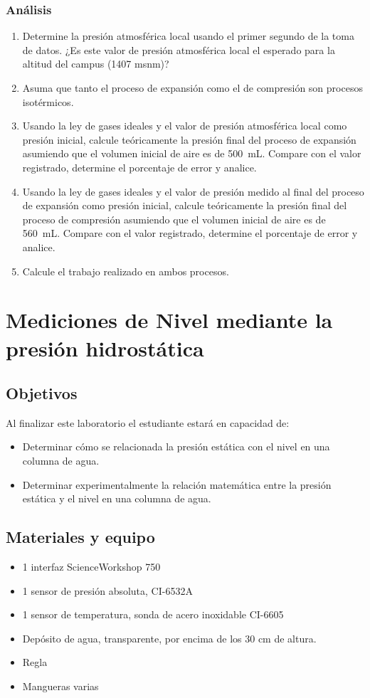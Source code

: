 \documentclass[12pt,letterpaper]{report}
\newcommand{\obj}{Objetivos}
\newcommand{\mat}{Materiales y equipo}
\newcommand{\capacidad}{Al finalizar este laboratorio el estudiante estará en capacidad de:}
\begin{document}
\subsection{Análisis}
\begin{enumerate}
    \item Determine la presión atmosférica local usando el primer segundo de la toma de datos. ¿Es este valor de presión atmosférica local el esperado para la altitud del campus (1407 msnm)?
    \item Asuma que tanto el proceso de expansión como el de compresión son procesos isotérmicos. 
    \item Usando la ley de gases ideales y el valor de presión atmosférica local como presión inicial, calcule teóricamente la presión final del proceso de expansión asumiendo que el volumen inicial de aire es de \SI{500}{\milli\liter}. Compare con el valor registrado, determine el porcentaje de error y analice.
    \item Usando la ley de gases ideales y el valor de presión medido al final del proceso de expansión como presión inicial, calcule teóricamente la presión final del proceso de compresión asumiendo que el volumen inicial de aire es de \SI{560}{\milli\liter}. Compare con el valor registrado, determine el porcentaje de error y analice.
    \item Calcule el trabajo realizado en ambos procesos.
\end{enumerate}




\chapter{Mediciones de Nivel mediante la presión hidrostática}
\section{\obj}
\capacidad
\begin{itemize}
\item Determinar cómo se relacionada la presión estática con el nivel en una
columna de agua.
\item Determinar experimentalmente la relación matemática entre la presión
estática y el nivel en una columna de agua.
\end{itemize}

\section{\mat}
\begin{itemize}
\item 1 interfaz ScienceWorkshop\,\textregistered\,750
\item 1 sensor de presión absoluta, CI-6532A
\item 1 sensor de temperatura, sonda de acero inoxidable CI-6605
\item Depósito de agua, transparente, por encima de los 30 cm de altura.
\item Regla
\item Mangueras varias
\end{itemize}
\end{document}
